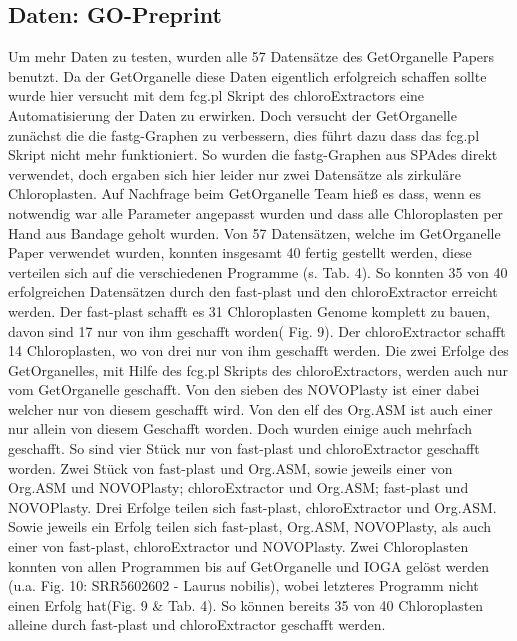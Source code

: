 \documentclass{scrartcl}
\begin{document}
\subsection{Daten: GO-Preprint}
\label{sec-4-4}
Um mehr Daten zu testen, wurden alle 57 Datensätze des GetOrganelle Papers \footnotemark[30]{} benutzt. Da der GetOrganelle diese Daten eigentlich erfolgreich schaffen sollte
wurde hier versucht mit dem fcg.pl Skript des chloroExtractors eine Automatisierung der Daten zu erwirken. Doch versucht der GetOrganelle zunächst die die fastg-Graphen
zu verbessern, dies führt dazu dass das fcg.pl Skript nicht mehr funktioniert. So wurden die fastg-Graphen aus SPAdes direkt verwendet, doch ergaben sich hier leider nur
zwei Datensätze als zirkuläre Chloroplasten. Auf Nachfrage beim GetOrganelle Team hieß es dass, wenn es notwendig war alle Parameter angepasst wurden und dass alle 
Chloroplasten per Hand aus Bandage geholt wurden. 
Von 57 Datensätzen, welche im GetOrganelle Paper verwendet wurden, konnten insgesamt 40 fertig gestellt werden, diese verteilen sich auf die verschiedenen Programme (s. Tab. 4).
So konnten 35 von 40 erfolgreichen Datensätzen durch den fast-plast und den chloroExtractor erreicht werden.  Der fast-plast schafft es 31 Chloroplasten Genome komplett
zu bauen, davon sind 17 nur von ihm geschafft worden( Fig. 9). Der chloroExtractor schafft 14 Chloroplasten, wo von drei nur von ihm geschafft werden. Die zwei Erfolge des GetOrganelles,
mit Hilfe des fcg.pl Skripts des chloroExtractors, werden auch nur vom GetOrganelle geschafft. Von den sieben des NOVOPlasty ist einer dabei welcher nur von diesem geschafft wird.
Von den elf des Org.ASM ist auch einer nur allein von diesem Geschafft worden. Doch wurden einige auch mehrfach geschafft. So sind vier Stück nur von fast-plast und chloroExtractor geschafft worden.
Zwei Stück von fast-plast und Org.ASM, sowie jeweils einer von Org.ASM und NOVOPlasty; chloroExtractor und Org.ASM; fast-plast und NOVOPlasty.
Drei Erfolge teilen sich fast-plast, chloroExtractor und Org.ASM. Sowie jeweils ein Erfolg teilen sich fast-plast, Org.ASM, NOVOPlasty, als auch einer von fast-plast, chloroExtractor und NOVOPlasty.
Zwei Chloroplasten konnten von allen Programmen bis auf GetOrganelle und IOGA gelöst werden (u.a. Fig. 10: SRR5602602 - Laurus nobilis), wobei letzteres Programm nicht einen Erfolg hat(Fig. 9 \& Tab. 4). 
So können bereits 35 von 40 Chloroplasten alleine durch fast-plast und chloroExtractor geschafft werden.
\end{document}
